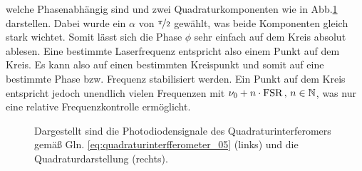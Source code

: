 welche Phasenabhängig sind und zwei Quadraturkomponenten wie in
Abb.\ref{fig:quadratursignale} darstellen. Dabei wurde ein $\alpha$ von
$\nicefrac{\pi}{2}$ gewählt, was beide Komponenten gleich stark wichtet. Somit
lässt sich die Phase $\phi$ sehr einfach auf dem Kreis absolut ablesen. Eine
bestimmte Laserfrequenz entspricht also einem Punkt auf dem Kreis. Es kann also
auf einen bestimmten Kreispunkt und somit auf eine bestimmte Phase bzw. Frequenz
stabilisiert werden. Ein Punkt auf dem Kreis entspricht jedoch unendlich vielen
Frequenzen mit $\nu_0+n\cdot\text{FSR}\,,\,n\in\mathbb{N}$, was nur eine relative
Frequenzkontrolle ermöglicht.
\begin{figure}[h]
	\centering
	\footnotesize
	
	\caption[Quadratursignale]{Dargestellt sind die
	Photodiodensignale des Quadraturinterferomers
	gemäß Gln. \eqref{eq:quadraturinterfferometer_05}
	(links) und die Quadraturdarstellung (rechts).}\label{fig:quadratursignale}
\end{figure}

